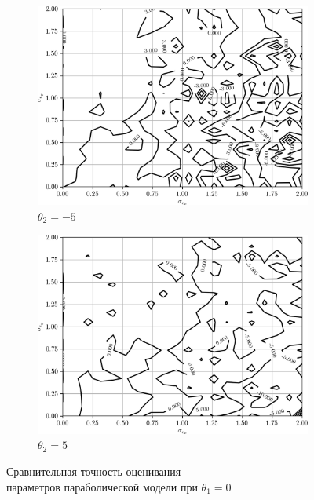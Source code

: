 \begin{figure}[p]
  \begin{subfigure}[b]{\linewidth}
    \centering
    \includegraphics[width=135mm]{fig/nonlinear/quadratic/a-0_b-0_c--5.png}
    \caption{\( \theta_2 = -5 \)}
  \end{subfigure}

  \vspace{2\baselineskip}
  \begin{subfigure}[b]{\linewidth}
    \centering
    \includegraphics[width=135mm]{fig/nonlinear/quadratic/a-0_b-0_c-5.png}
    \caption{\( \theta_2 = 5 \)}
  \end{subfigure}

  \vspace{\baselineskip}
  \caption{
    Сравнительная точность оценивания \\
    параметров параболической модели при \( \theta_1 = 0 \)
  }\label{fig:comparison_nonlinear_quadratic_b-0}
\end{figure}

